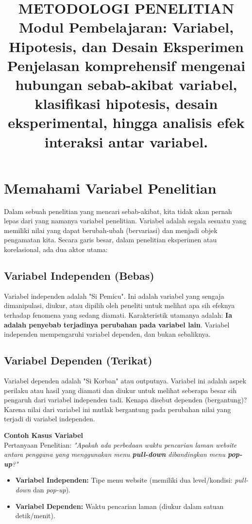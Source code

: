 \documentclass[12pt,a4paper]{article}
\title{
  {\LARGE\bfseries METODOLOGI PENELITIAN}\\[0.5em]
  {\large Modul Pembelajaran: Variabel, Hipotesis, dan Desain Eksperimen}\\[0.8em]
  {\normalsize Penjelasan komprehensif mengenai hubungan sebab-akibat variabel, klasifikasi hipotesis, desain eksperimental, hingga analisis efek interaksi antar variabel.}
}
\author{}
\date{}
\begin{document}
\maketitle
\thispagestyle{fancy}
\tableofcontents
\newpage


\section{Memahami Variabel Penelitian}

Dalam sebuah penelitian yang mencari sebab-akibat, kita tidak akan pernah lepas dari yang namanya variabel penelitian. Variabel adalah segala sesuatu yang memiliki nilai yang dapat berubah-ubah (bervariasi) dan menjadi objek pengamatan kita. Secara garis besar, dalam penelitian eksperimen atau korelasional, ada dua aktor utama:

\subsection{Variabel Independen (Bebas)}
Variabel independen adalah "Si Pemicu". Ini adalah variabel yang sengaja dimanipulasi, diukur, atau dipilih oleh peneliti untuk melihat apa sih efeknya terhadap fenomena yang sedang diamati. 
Karakteristik utamanya adalah: \textbf{Ia adalah penyebab terjadinya perubahan pada variabel lain}. Variabel independen mempengaruhi variabel dependen, dan bukan sebaliknya.

\subsection{Variabel Dependen (Terikat)}
Variabel dependen adalah "Si Korban" atau outputnya. Variabel ini adalah aspek perilaku atau hasil yang diamati dan diukur untuk melihat seberapa besar sih pengaruh dari variabel independen tadi. 
Kenapa disebut dependen (bergantung)? Karena nilai dari variabel ini mutlak bergantung pada perubahan nilai yang terjadi di variabel independen.

\begin{notebox}
\textbf{Contoh Kasus Variabel}\\
Pertanyaan Penelitian: \textit{"Apakah ada perbedaan waktu pencarian laman website antara pengguna yang menggunakan menu \textbf{pull-down} dibandingkan menu \textbf{pop-up}?"}
\begin{itemize}
    \item \textbf{Variabel Independen:} Tipe menu website (memiliki dua level/kondisi: \textit{pull-down} dan \textit{pop-up}).
    \item \textbf{Variabel Dependen:} Waktu pencarian laman (diukur dalam satuan detik/menit).
\end{itemize}
\end{notebox}
\end{document}
